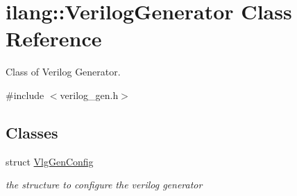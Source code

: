 \hypertarget{classilang_1_1_verilog_generator}{}\section{ilang\+:\+:Verilog\+Generator Class Reference}
\label{classilang_1_1_verilog_generator}


Class of Verilog Generator.  




{\ttfamily \#include $<$verilog\+\_\+gen.\+h$>$}

\subsection*{Classes}
\begin{DoxyCompactItemize}
\item 
struct \mbox{\hyperlink{structilang_1_1_verilog_generator_1_1_vlg_gen_config}{Vlg\+Gen\+Config}}
\begin{DoxyCompactList}\small\item\em the structure to configure the verilog generator \end{DoxyCompactList}\end{DoxyCompactItemize}
